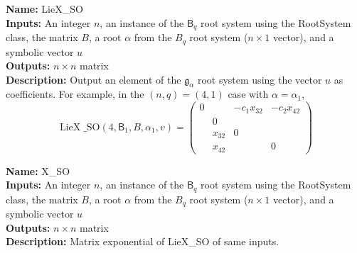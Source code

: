 \documentclass[12pt]{article}
\theoremstyle{definition}
\numberwithin{theorem}{subsection}
\newcommand{\tbf}{\textbf}
\newcommand{\noi}{\noindent}
\newcommand{\frakg}{\mathfrak{g}}
\DeclareMathOperator{\LieX}{LieX}
\begin{document}

\begin{framed}
\noi \tbf{Name:} LieX\_SO \\
\noi \tbf{Inputs:} An integer $n$, an instance of the $\mathsf{B}_{q}$ root system using the RootSystem class, the matrix $B$, a root $\alpha$ from the $B_{q}$ root system ($n \times 1$ vector), and a symbolic vector $u$ \\
\noi \tbf{Outputs:} $n \times n$ matrix \\
\noi \tbf{Description:} Output an element of the $\frakg_{\alpha}$ root system using the vector $u$ as coefficients. For example, in the $(n,q) = (4,1)$ case with $\alpha = \alpha_1$, 
\[
	\LieX\_\text{SO}(4, \mathsf{B}_1, B, \alpha_1, v) =
	\begin{pmatrix}
		0 && - c_1 x_{32}  & - c_2 x_{42} \\
		& 0 &  \\
		& x_{32} & 0 &  \\
		& x_{42} && 0
	\end{pmatrix}
\]
\end{framed}

\begin{framed}
\noi \tbf{Name:} X\_SO \\
\noi \tbf{Inputs:} An integer $n$, an instance of the $\mathsf{B}_{q}$ root system using the RootSystem class, the matrix $B$, a root $\alpha$ from the $B_{q}$ root system ($n \times 1$ vector), and a symbolic vector $u$ \\
\noi \tbf{Outputs:} $n \times n$ matrix \\
\noi \tbf{Description:} Matrix exponential of LieX\_SO of same inputs.
\end{framed}
\end{document}
